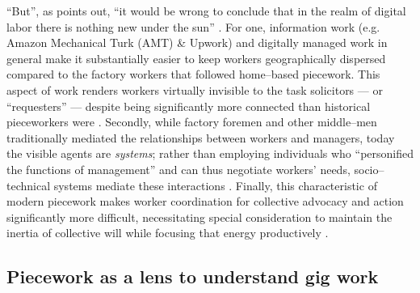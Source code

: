 \documentclass{sigchi}
\newcommand{\ali}[1]{{\color{BrickRed}[\itshape al2: #1\upshape]}}
\begin{document}
``But'',
as \citeauthor{scholz2012digital} points out,
``it would be wrong to conclude that
in the realm of digital labor there is nothing new under the sun''
\cite{scholz2012digital}.
For one, information work
(e.g. Amazon Mechanical Turk (AMT) \& Upwork)
and digitally managed work in general make it substantially easier
to keep workers geographically dispersed
compared to the factory workers that followed home--based piecework.
This aspect of work renders workers virtually invisible to the task solicitors
--- or ``requesters'' ---
despite being significantly more connected than historical pieceworkers were %
\cite{turkopticon}.
Secondly, while
factory foremen and other middle--men
traditionally mediated the relationships between workers and managers,
today the visible agents are \textit{systems};
rather than employing individuals who ``personified the functions of management''
and can thus negotiate workers' needs,
socio--technical systems mediate these interactions %
\cite{wray1949marginal}.
Finally, this characteristic of modern piecework makes
worker coordination for collective advocacy and action significantly more difficult,
necessitating special consideration to maintain the inertia of collective will
while focusing that energy productively
\cite{dynamo}.


\subsection{Piecework as a lens to understand gig work}
\end{document}
